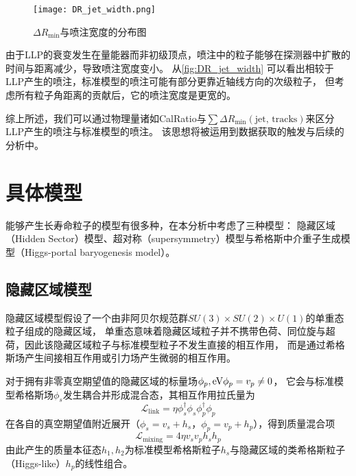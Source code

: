 \begin{figure}[ht]
    \centering
    \texttt{[image: DR\_jet\_width.png]}
    \caption{$\Delta R_{\min}$与喷注宽度的分布图}
    \label{fig:DR_jet_width}
\end{figure}

由于LLP的衰变发生在量能器而非初级顶点，喷注中的粒子能够在探测器中扩散的时间与距离减少，导致喷注宽度变小。
从\autoref{fig:DR_jet_width} 可以看出相较于LLP产生的喷注，标准模型的喷注可能有部分更靠近轴线方向的次级粒子，
但考虑所有粒子角距离的贡献后，它的喷注宽度是更宽的。

综上所述，我们可以通过物理量诸如CalRatio与$\sum \Delta R_{\text{min}}(\text{jet, tracks})$来区分LLP产生的喷注与标准模型的喷注。
该思想将被运用到数据获取的触发与后续的分析中。


\section{具体模型}
能够产生长寿命粒子的模型有很多种，在本分析中考虑了三种模型：
隐藏区域（Hidden Sector）模型、超对称（supersymmetry）模型与希格斯中介重子生成模型（Higgs-portal baryogenesis model）。


\subsection{隐藏区域模型}
隐藏区域模型假设了一个由非阿贝尔规范群$SU(3)\times SU(2) \times U(1)$的单重态粒子组成的隐藏区域，
单重态意味着隐藏区域粒子并不携带色荷、同位旋与超荷，因此该隐藏区域粒子与标准模型粒子不发生直接的相互作用，
而是通过希格斯场产生间接相互作用或引力场产生微弱的相互作用。
\cite{hidden_sector}

对于拥有非零真空期望值的隐藏区域的标量场$\phi_p, \text{eV}{\phi_p}=v_p \neq 0$，
它会与标准模型希格斯场$\phi_s$发生耦合并形成混合态，其相互作用拉氏量为
\begin{equation}
    \mathcal{L}_\text{link} = \eta \phi^\dagger_s \phi_s \phi^\dagger_p \phi_p
\end{equation}
在各自的真空期望值附近展开（$\phi_s = v_s + h_s$，$\phi_p = v_p + h_p$），得到质量混合项
\begin{equation}
    \mathcal{L}_\text{mixing} = 4 \eta v_s v_p h_s h_p
\end{equation}
由此产生的质量本征态$h_1, h_2$为标准模型希格斯粒子$h_s$与隐藏区域的类希格斯粒子（Higgs-like）$h_p$的线性组合。

